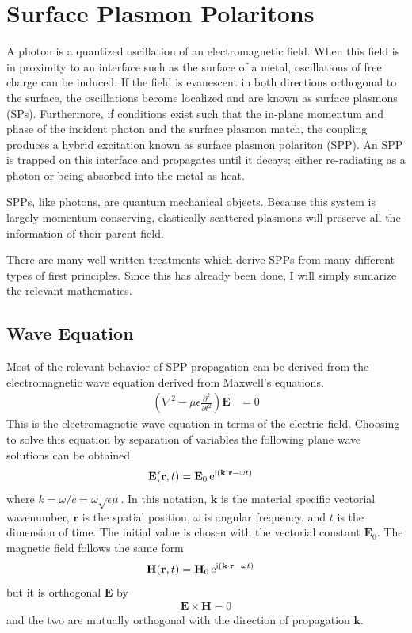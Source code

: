 \documentclass[a4paper,titlepage,onecolumn]{report}
\begin{document}
\section{Surface Plasmon Polaritons}
A photon is a quantized oscillation of an electromagnetic field.  When this
field is in proximity to an interface such as the surface
of a metal, oscillations of free charge can be induced.  If the field is
evanescent in both directions orthogonal to the surface, the oscillations
become localized and are known as surface plasmons (SPs).  Furthermore, if
conditions exist such that the in-plane momentum and phase of the incident
photon and the surface plasmon match, the coupling produces a hybrid
excitation known as surface plasmon polariton (SPP).  An SPP is trapped on
this interface and propagates until it decays; either re-radiating as a
photon or being absorbed into the metal as heat.

SPPs, like photons, are quantum mechanical objects.  Because this system is
largely momentum-conserving, elastically scattered plasmons will preserve
all the information of their parent field.

There are many well written treatments which derive SPPs from 
many different types of first principles.  Since this has already been
done, I will simply sumarize the relevant mathematics.

\subsection{Wave Equation}
Most of the relevant behavior of SPP propagation can be derived from the
electromagnetic wave equation derived from Maxwell's equations.
\begin{align}
\left(\nabla^2-\mu\epsilon\frac{\partial^2}{\partial t^2}\right)\mathbf{E}&=0
\label{eqn:ewe}
\end{align}
This is the electromagnetic wave equation in terms of the electric field.
Choosing to solve this equation by separation of variables the following
plane wave solutions can be obtained
\begin{align}
 \mathbf{E} ( \mathbf{r}, t ) &= \mathbf{E}_0\, {\mathrm{e}}^{{\mathrm{i}} (\mathbf{k} \cdot \mathbf{r} - \omega t )}
\label{eqn:planewaves}
\end{align}
where $k=\omega/c=\omega\sqrt{\epsilon\mu}$.  In this notation,
$\mathbf{k}$ is the material specific vectorial wavenumber, $\mathbf{r}$ is the
spatial position, $\omega$ is angular frequency, and $t$ is
the dimension of time.
The initial value is chosen with the vectorial constant $\mathbf{E}_0$.
The magnetic field follows the same form
\begin{align}
 \mathbf{H} ( \mathbf{r}, t ) &= \mathbf{H}_0\, {\mathrm{e}}^{{\mathrm{i}} (\mathbf{k}
 \cdot \mathbf{r} - \omega t )}
\end{align} 
but it is orthogonal $\mathbf{E}$ by
\begin{align}
\mathbf{E} \times \mathbf{H} = 0
\end{align}
and the two are mutually orthogonal with the direction of propagation
$\mathbf{k}$.
\end{document}
